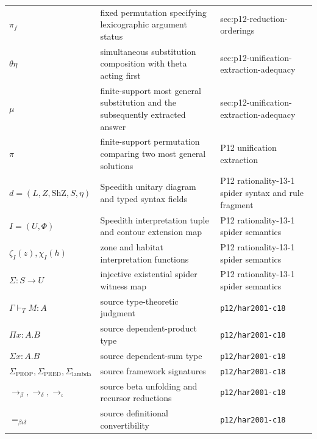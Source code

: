 \begin{longtable}{@{}p{}p{}p{}@{}}
\(\pi_f\) & fixed permutation specifying lexicographic argument status & sec:\allowbreak{}p12-\allowbreak{}reduction-\allowbreak{}orderings \\
\(\theta\eta\) & simultaneous substitution composition with theta acting first & sec:\allowbreak{}p12-\allowbreak{}unification-\allowbreak{}extraction-\allowbreak{}adequacy \\
\(\mu\) & finite-support most general substitution and the subsequently extracted answer & sec:\allowbreak{}p12-\allowbreak{}unification-\allowbreak{}extraction-\allowbreak{}adequacy \\
\(\pi\) & finite-support permutation comparing two most general solutions & P12 unification extraction \\
\(d=(L,\allowbreak Z,\allowbreak \mathrm{ShZ},\allowbreak S,\allowbreak \eta)\) & Speedith unitary diagram and typed syntax fields & P12 rationality-\allowbreak{}13-\allowbreak{}1 spider syntax and rule fragment \\
\(I=(U,\allowbreak \Phi)\) & Speedith interpretation tuple and contour extension map & P12 rationality-\allowbreak{}13-\allowbreak{}1 spider semantics \\
\(\zeta_I(z),\allowbreak \chi_I(h)\) & zone and habitat interpretation functions & P12 rationality-\allowbreak{}13-\allowbreak{}1 spider semantics \\
\(\Sigma:S\to U\) & injective existential spider witness map & P12 rationality-\allowbreak{}13-\allowbreak{}1 spider semantics \\
\(\Gamma\vdash_T M:A\) & source type-theoretic judgment & \texttt{p12/\allowbreak{}har2001-\allowbreak{}c18} \\
\(\Pi x:A.B\) & source dependent-product type & \texttt{p12/\allowbreak{}har2001-\allowbreak{}c18} \\
\(\Sigma x:A.B\) & source dependent-sum type & \texttt{p12/\allowbreak{}har2001-\allowbreak{}c18} \\
\(\Sigma_{\mathrm{PROP}},\allowbreak \Sigma_{\mathrm{PRED}},\allowbreak \Sigma_{\mathrm{lambda}}\) & source framework signatures & \texttt{p12/\allowbreak{}har2001-\allowbreak{}c18} \\
\(\to_\beta,\allowbreak \to_\delta,\allowbreak \to_\iota\) & source beta unfolding and recursor reductions & \texttt{p12/\allowbreak{}har2001-\allowbreak{}c18} \\
\(=_{\beta\iota\delta}\) & source definitional convertibility & \texttt{p12/\allowbreak{}har2001-\allowbreak{}c18} \\

\end{longtable}
